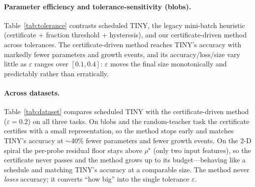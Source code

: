\documentclass{article}
\newcommand{\eps}{\varepsilon}
\begin{document}
\paragraph{Parameter efficiency and tolerance-sensitivity (blobs).}
Table~\ref{tab:tolerance} contrasts scheduled TINY, the legacy mini-batch
heuristic (certificate + fraction threshold + hysteresis), and our
certificate-driven method across tolerances. The certificate-driven method
reaches TINY's accuracy with markedly fewer parameters and growth events, and its
accuracy/loss/size vary little as $\eps$ ranges over $[0.1,0.4]$: $\eps$ moves the
final size monotonically and predictably rather than erratically.
\begin{table}[t]\centering
\caption{Blobs: tolerance sensitivity. mean$\pm$std over seeds $\{0,1,2\}$.}
\label{tab:tolerance}

\end{table}

\paragraph{Across datasets.}
Table~\ref{tab:dataset} compares scheduled TINY with the certificate-driven
method ($\eps=0.2$) on all three tasks. On blobs and the random-teacher task the
certificate certifies with a small representation, so the method stops early and
matches TINY's accuracy at $\sim$40\% fewer parameters and fewer growth events. On
the 2-D spiral the per-probe residual floor stays above $\rho^\star$ (only two
input features), so the certificate never passes and the method grows up to its
budget---behaving like a schedule and matching TINY's accuracy at a comparable
size. The method never \emph{loses} accuracy; it converts ``how big'' into the
single tolerance $\eps$.
\begin{table}[t]\centering
\caption{Head-to-head per dataset. mean$\pm$std over seeds $\{0,1,2\}$.}
\label{tab:dataset}

\end{table}
\end{document}
